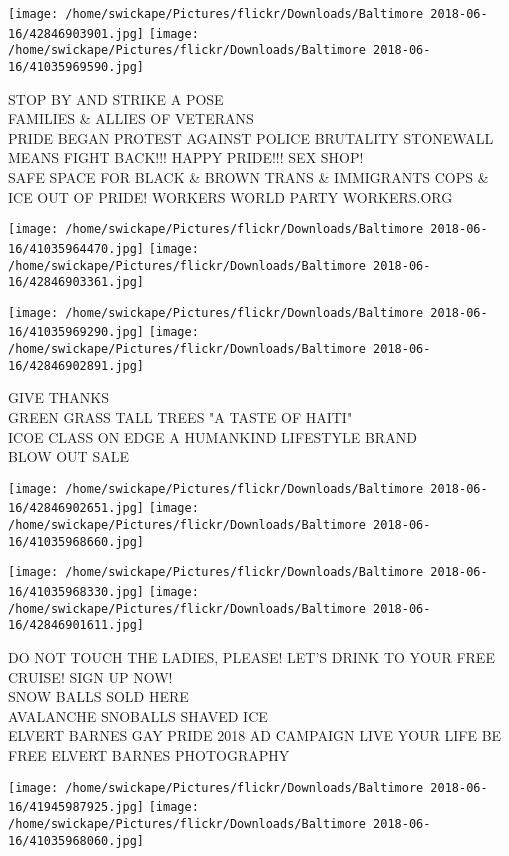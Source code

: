 \documentclass[10pt,letterpaper]{article}
\begin{document}
\texttt{[image: /home/swickape/Pictures/flickr/Downloads/Baltimore 2018-06-16/42846903901.jpg]}
\texttt{[image: /home/swickape/Pictures/flickr/Downloads/Baltimore 2018-06-16/41035969590.jpg]}

STOP BY AND STRIKE A POSE\\
FAMILIES \& ALLIES OF VETERANS\\
PRIDE BEGAN PROTEST AGAINST POLICE BRUTALITY STONEWALL MEANS FIGHT BACK!!! HAPPY PRIDE!!! SEX SHOP!\\
SAFE SPACE FOR BLACK \& BROWN TRANS \& IMMIGRANTS COPS \& ICE OUT OF PRIDE!  WORKERS WORLD PARTY WORKERS.ORG
\pagebreak

\texttt{[image: /home/swickape/Pictures/flickr/Downloads/Baltimore 2018-06-16/41035964470.jpg]}
\texttt{[image: /home/swickape/Pictures/flickr/Downloads/Baltimore 2018-06-16/42846903361.jpg]}

\texttt{[image: /home/swickape/Pictures/flickr/Downloads/Baltimore 2018-06-16/41035969290.jpg]}
\texttt{[image: /home/swickape/Pictures/flickr/Downloads/Baltimore 2018-06-16/42846902891.jpg]}

GIVE THANKS\\
GREEN GRASS TALL TREES "A TASTE OF HAITI"\\
ICOE CLASS ON EDGE A HUMANKIND LIFESTYLE BRAND\\
BLOW OUT SALE
\pagebreak

\texttt{[image: /home/swickape/Pictures/flickr/Downloads/Baltimore 2018-06-16/42846902651.jpg]}
\texttt{[image: /home/swickape/Pictures/flickr/Downloads/Baltimore 2018-06-16/41035968660.jpg]}

\texttt{[image: /home/swickape/Pictures/flickr/Downloads/Baltimore 2018-06-16/41035968330.jpg]}
\texttt{[image: /home/swickape/Pictures/flickr/Downloads/Baltimore 2018-06-16/42846901611.jpg]}

DO NOT TOUCH THE LADIES, PLEASE!  LET'S DRINK TO YOUR FREE CRUISE!  SIGN UP NOW!\\
SNOW BALLS SOLD HERE\\
AVALANCHE SNOBALLS SHAVED ICE\\
ELVERT BARNES GAY PRIDE 2018 AD CAMPAIGN LIVE YOUR LIFE BE FREE ELVERT BARNES PHOTOGRAPHY
\pagebreak

\texttt{[image: /home/swickape/Pictures/flickr/Downloads/Baltimore 2018-06-16/41945987925.jpg]}
\texttt{[image: /home/swickape/Pictures/flickr/Downloads/Baltimore 2018-06-16/41035968060.jpg]}
\end{document}
